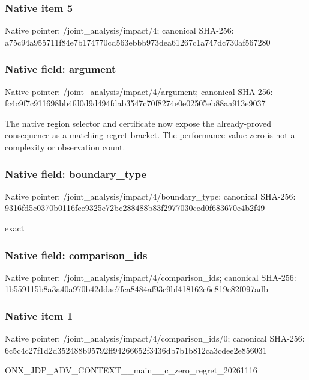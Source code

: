 \documentclass[10pt,a4paper]{article}
\begin{document}
\subsubsection{Native item 5}
Native pointer: /joint\_\allowbreak{}analysis/impact/4; canonical SHA-256: a75c94a955711f84e7b174770cd563ebbb973dea61267c1a747dc730af567280

\subsubsection{Native field: argument}
Native pointer: /joint\_\allowbreak{}analysis/impact/4/argument; canonical SHA-256: fc4c9f7c911698bb4fd0d9d494fdab3547c70f8274e0e02505eb88aa913e9037

\begingroup\raggedright\sloppy The native region selector and certificate now expose the already-proved consequence as a matching regret bracket. The performance value zero is not a complexity or observation count.\par\endgroup

\subsubsection{Native field: boundary\_\allowbreak{}type}
Native pointer: /joint\_\allowbreak{}analysis/impact/4/boundary\_\allowbreak{}type; canonical SHA-256: 9316fd5c0370b0116fce9325e72bc288488b83f2977030ced0f683670e4b2f49

\begingroup\raggedright\sloppy exact\par\endgroup

\subsubsection{Native field: comparison\_\allowbreak{}ids}
Native pointer: /joint\_\allowbreak{}analysis/impact/4/comparison\_\allowbreak{}ids; canonical SHA-256: 1b559115b8a3a40a970b42ddac7fea8484af93c9bf418162e6e819e82f097adb

\subsubsection{Native item 1}
Native pointer: /joint\_\allowbreak{}analysis/impact/4/comparison\_\allowbreak{}ids/0; canonical SHA-256: 6c5c4c27f1d2d352488b95792ff94266652f3436db7b1b812ca3cdee2e856031

\begingroup\raggedright\sloppy ONX\_\allowbreak{}JDP\_\allowbreak{}ADV\_\allowbreak{}CONTEXT\_\allowbreak{}\_\allowbreak{}main\_\allowbreak{}\_\allowbreak{}c\_\allowbreak{}zero\_\allowbreak{}regret\_\allowbreak{}20261116\par\endgroup
\end{document}
